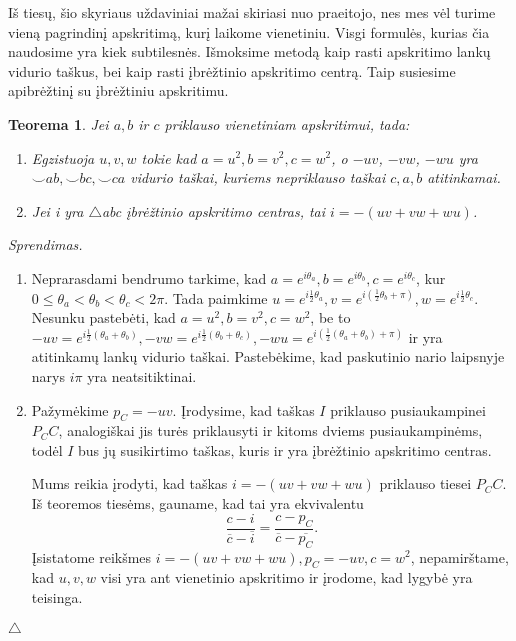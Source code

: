 \documentclass[11pt,a4paper,twoside]{book}
\def\leq{\leqslant}
\newenvironment{sprendimas}{\noindent \textit{Sprendimas.}}{\hfill $\triangle$}
\newtheorem{thmnr}{Teorema}
\theoremstyle{definition} \newtheorem*{api}{Apibrėžimas}
\theoremstyle{remark} \newtheorem*{pastaba}{Pastaba}
\begin{document}
Iš tiesų, šio skyriaus uždaviniai mažai skiriasi nuo praeitojo, nes mes vėl turime vieną pagrindinį apskritimą, kurį laikome vienetiniu. Visgi formulės, kurias čia naudosime yra kiek subtilesnės. Išmoksime metodą kaip rasti apskritimo lankų vidurio taškus, bei kaip rasti įbrėžtinio apskritimo centrą. Taip susiesime apibrėžtinį su įbrėžtiniu apskritimu.

\begin{thmnr} Jei $a, b$ ir $c$ priklauso vienetiniam apskritimui, tada:\
\begin{enumerate}
\item Egzistuoja $u, v, w$ tokie kad $a=u^2, b=v^2, c=w^2$, o $-uv$, $-vw$, $-wu$ yra $\smile ab, \smile bc, \smile ca$ vidurio taškai, kuriems nepriklauso taškai $c, a, b$ atitinkamai.
\item Jei i yra $\bigtriangleup$abc įbrėžtinio apskritimo centras, tai $i= - (uv + vw + wu)$.
\end{enumerate}
\end{thmnr}

\begin{sprendimas}
\begin{enumerate}
\item Neprarasdami bendrumo tarkime, kad $a=e^{i\theta_a}, b=e^{i\theta_b}, c=e^{i\theta_c}$, kur $0 \leq \theta_a < \theta_b < \theta_c < 2\pi$. Tada paimkime $u=e^{i\frac{1}{2}\theta_a}, v=e^{i(\frac{1}{2}\theta_b+\pi)}, w=e^{i\frac{1}{2}\theta_c}$. Nesunku pastebėti, kad $a=u^{2}, b=v^{2}, c=w^{2}$, be to $-uv=e^{i\frac{1}{2}(\theta_a+\theta_b)}, -vw=e^{i\frac{1}{2}(\theta_b+\theta_c)}, -wu=e^{i(\frac{1}{2}(\theta_a+\theta_b)+\pi)}$ ir yra atitinkamų lankų vidurio taškai. Pastebėkime, kad paskutinio nario laipsnyje narys $i\pi$ yra neatsitiktinai.
\item Pažymėkime $p_C=-uv$. Įrodysime, kad taškas $I$ priklauso pusiaukampinei $P_CC$, analogiškai jis turės priklausyti ir kitoms dviems pusiaukampinėms, todėl $I$ bus jų susikirtimo taškas, kuris ir yra įbrėžtinio apskritimo centras.

Mums reikia įrodyti, kad taškas $i=-(uv+vw+wu)$ priklauso tiesei $P_CC$. Iš teoremos tiesėms, gauname, kad tai yra ekvivalentu $$\frac{c-i}{\overline c - \overline i}=\frac{c-p_C}{\overline {c} - \overline {p_C}}.$$
Įsistatome reikšmes $i=-(uv+vw+wu), p_C=-uv, c=w^2$, nepamirštame, kad $u, v, w$ visi yra ant vienetinio apskritimo ir įrodome, kad lygybė yra teisinga.
\end{enumerate}
\end{sprendimas}
\end{document}
